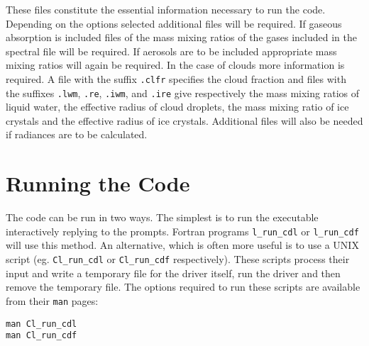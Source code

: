 These files constitute the essential information necessary to run the code.
Depending on the options selected additional files will be required. If
gaseous absorption is included files of the mass mixing ratios of the gases
included in the spectral file will be required. If aerosols are to be
included appropriate mass mixing ratios will again be required. In the case
of clouds more information is required. A file with the suffix {\tt .clfr}
specifies the cloud fraction and files with the suffixes {\tt .lwm}, 
{\tt .re}, {\tt .iwm}, and {\tt .ire} give respectively the mass mixing
ratios of liquid water, the effective radius of cloud droplets, the mass
mixing ratio of ice crystals and the effective radius of ice crystals. Additional files will also be needed if radiances are to be calculated.


\section{Running the Code}

The code can be run in two ways. The simplest is to run the executable
interactively replying to the prompts. Fortran programs  {\tt l\_run\_cdl} or
{\tt l\_run\_cdf} will use this method. An alternative, which is often more
useful is to use a UNIX script (eg. {\tt Cl\_run\_cdl} or {\tt Cl\_run\_cdf}
respectively). These scripts process their input and write a temporary
file for the driver itself, run the driver and then remove the
temporary file. The options required to run these scripts are available 
from their {\tt man} pages:

\begin{verbatim}
man Cl_run_cdl
man Cl_run_cdf
\end{verbatim}
